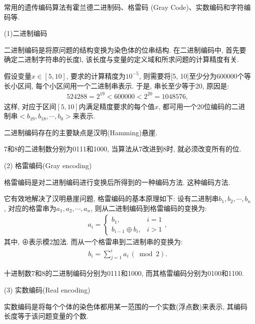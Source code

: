 常用的遗传编码算法有霍兰德二进制码、格雷码 (Gray Code)、实数编码和字符编码等.

(1)二进制编码

二进制编码是将原问题的结构变换为染色体的位串结构. 在二进制编码中, 首先要确定二进制字符串的长度l, 该长度与变量的定义域和所求问题的计算精度有关.
\begin{example}
假设变量$x\in [5,10]$, 要求的计算精度为$10^{-5}$, 则需要将[5, 10]至少分为600000个等长小区间, 每个小区间用一个二进制串表示. 于是, 串长至少等于20, 原因是:
\begin{align*}
  524288=2^{19}<600000<2^{20}=1048576,
\end{align*}
这样, 对应于区间$[5,10]$内满足精度要求的每个值$x$, 都可用一个20位编码的二进制串$<b_{19},b_{18},\cdots,b_0>$来表示.
\end{example}

二进制编码存在的主要缺点是汉明(Hamming)悬崖.

\begin{example}
  7和8的二进制数分别为0111和1000, 当算法从7改进到8时, 就必须改变所有的位.
\end{example}

 (2) 格雷编码(Gray encoding)

格雷编码是对二进制编码进行变换后所得到的一种编码方法. 这种编码方法.

它有效地解决了汉明悬崖问题, 格雷编码的基本原理如下:
设有二进制串$b_1,b_2,\cdots,b_n$, 对应的格雷串为$a_1,a_2,\cdots,a_n$, 则从二进制编码到格雷编码的变换为:
\begin{align}
    a_{i}=\left\{\begin{array}{ll}{b_{1},} & {i=1} \\
    {b_{i-1} \oplus b_{i}}, & {i>1}\end{array}\right.,
\end{align}
其中, ⊕表示模2加法. 而从一个格雷串到二进制串的变换为:
\begin{align}
    b_{i}=\sum_{j=1}^{i} a_{i}\,(\bmod 2).
\end{align}
\begin{example}
    十进制数7和8的二进制编码分别为0111和1000, 而其格雷编码分别为0100和1100.
\end{example}

 (3) 实数编码(Real encoding)


实数编码是将每个个体的染色体都用某一范围的一个实数(浮点数)来表示, 其编码长度等于该问题变量的个数.


